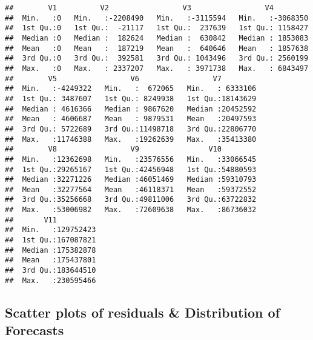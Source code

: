 \documentclass[]{article}
\begin{document}
\begin{verbatim}
##        V1          V2                 V3                 V4          
##  Min.   :0   Min.   :-2208490   Min.   :-3115594   Min.   :-3068350  
##  1st Qu.:0   1st Qu.:  -21117   1st Qu.:  237639   1st Qu.: 1158427  
##  Median :0   Median :  182624   Median :  630842   Median : 1853083  
##  Mean   :0   Mean   :  187219   Mean   :  640646   Mean   : 1857638  
##  3rd Qu.:0   3rd Qu.:  392581   3rd Qu.: 1043496   3rd Qu.: 2560199  
##  Max.   :0   Max.   : 2337207   Max.   : 3971738   Max.   : 6843497  
##        V5                 V6                 V7          
##  Min.   :-4249322   Min.   :  672065   Min.   : 6333106  
##  1st Qu.: 3487607   1st Qu.: 8249938   1st Qu.:18143629  
##  Median : 4616366   Median : 9867620   Median :20452592  
##  Mean   : 4606687   Mean   : 9879531   Mean   :20497593  
##  3rd Qu.: 5722689   3rd Qu.:11498718   3rd Qu.:22806770  
##  Max.   :11746388   Max.   :19262639   Max.   :35413380  
##        V8                 V9                V10          
##  Min.   :12362698   Min.   :23576556   Min.   :33066545  
##  1st Qu.:29265167   1st Qu.:42456948   1st Qu.:54880593  
##  Median :32271226   Median :46051469   Median :59310793  
##  Mean   :32277564   Mean   :46118371   Mean   :59372552  
##  3rd Qu.:35256668   3rd Qu.:49811006   3rd Qu.:63722832  
##  Max.   :53006982   Max.   :72609638   Max.   :86736032  
##       V11           
##  Min.   :129752423  
##  1st Qu.:167087821  
##  Median :175382878  
##  Mean   :175437801  
##  3rd Qu.:183644510  
##  Max.   :230595466
\end{verbatim}

\hypertarget{scatter-plots-of-residuals-distribution-of-forecasts}{%
\subsection{Scatter plots of residuals \& Distribution of
Forecasts}\label{scatter-plots-of-residuals-distribution-of-forecasts}}
\end{document}
